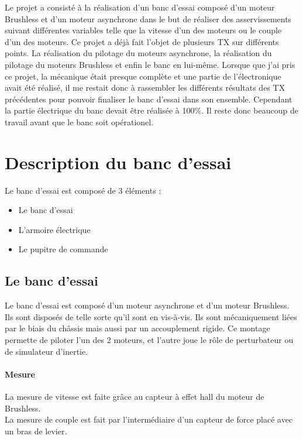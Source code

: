 \documentclass[11pt]{article}
\begin{document}
Le projet a consisté à la réalisation d'un banc d'essai composé d'un moteur Brushless et d'un moteur asynchrone dans le but de réaliser des asservissements suivant différentes variables telle que la vitesse d'un des moteurs ou le couple d'un des moteurs. Ce projet a déjà fait l'objet de plusieurs TX sur différents points. La réalisation du pilotage du moteurs asynchrone, la réalisation du pilotage du moteurs Brushless et enfin le banc en lui-même. Lorsque que j'ai pris ce projet, la mécanique était presque complète et une partie de l’électronique avait été réalisé, il me restait donc à rassembler les différents résultats des TX précédentes pour pouvoir finaliser le banc d'essai dans son ensemble. Cependant la partie électrique du banc devait être réalisée à 100\%. Il reste donc beaucoup de travail avant que le banc soit opérationel.

\newpage

\section{Description du banc d'essai}
Le banc d'essai est composé de 3 éléments :

\begin{itemize}
	\item Le banc d'essai
	\item L'armoire électrique
	\item Le pupitre de commande
\end{itemize}

\subsection{Le banc d'essai}

Le banc d'essai est composé d'un moteur asynchrone et d'un moteur Brushless. Ils sont disposés de telle sorte qu'il sont en vis-à-vis. Ils sont mécaniquement liées par le biais du châssis mais aussi par un accouplement rigide. Ce montage permette de piloter l'un des 2 moteurs, et l'autre joue le rôle de perturbateur ou de simulateur d'inertie.

\paragraph{Mesure \\}

La mesure de vitesse est faite grâce au capteur à effet hall du moteur de Brushless.
\\
La mesure de couple est fait par l'intermédiaire d'un capteur de force placé avec un bras de levier.\\
\end{document}
